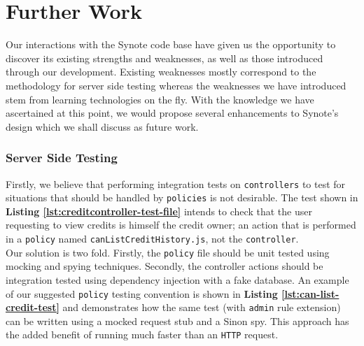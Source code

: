 \chapter{Further Work}
\label{chap:further-work}


Our interactions with the Synote code base have given us the opportunity to discover its existing strengths and weaknesses, as well as those introduced through our development. Existing weaknesses mostly correspond to the methodology for server side testing whereas the weaknesses we have introduced stem from learning technologies on the fly. With the knowledge we have ascertained at this point, we would propose several enhancements to Synote's design which we shall discuss as future work.

\subsection{Server Side Testing}
\label{subsec:server-side-testing}

Firstly, we believe that performing integration tests on \texttt{controllers} to test for situations that should be handled by \texttt{policies} is not desirable. The test shown in \textbf{Listing \ref{lst:creditcontroller-test-file}} intends to check that the user requesting to view credits is himself the credit owner; an action that is performed in a \texttt{policy} named \texttt{canListCreditHistory.js}, not the \texttt{controller}.\\

Our solution is two fold. Firstly, the \texttt{policy} file should be unit tested using mocking and spying techniques. Secondly, the controller actions should be integration tested using dependency injection with a fake database. An example of our suggested \texttt{policy} testing convention is shown in \textbf{Listing \ref{lst:can-list-credit-test}} and demonstrates how the same test (with \texttt{admin} rule extension) can be written using a mocked request stub and a Sinon spy. This approach has the added benefit of running much faster than an \texttt{HTTP} request.\\

